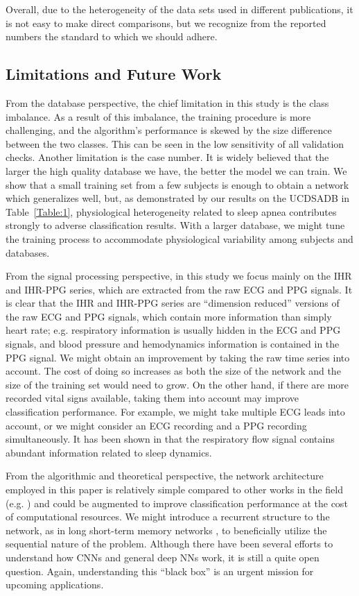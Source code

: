 \documentclass[10pt,a4paper,english]{amsart}
\begin{document}
Overall, due to the heterogeneity of the data sets used in different publications, it is not easy to make direct comparisons, but we recognize from the reported numbers the standard to which we should adhere.


\subsection{Limitations and Future Work}

From the database perspective, the chief limitation in this study is the class imbalance. As a result of this imbalance, the training procedure is more challenging, and the algorithm's performance is skewed by the size difference between the two classes. This can be seen in the low sensitivity of all validation checks. Another limitation is the case number. It is widely believed that the larger the high quality database we have, the better the model we can train. We show that a small training set from a few subjects is enough to obtain a network which generalizes well, but, as demonstrated by our results on the UCDSADB in Table~\ref{Table:1}, physiological heterogeneity related to sleep apnea contributes strongly to adverse classification results.  With a larger database, we might tune the training process to accommodate physiological variability among subjects and databases. 

From the signal processing perspective, in this study we focus mainly on the IHR and IHR-PPG series, which are extracted from the raw ECG and PPG signals. It is clear that the IHR and IHR-PPG series are ``dimension reduced'' versions of the raw ECG and PPG signals, which contain more information than simply heart rate; e.g. respiratory information is usually hidden in the ECG and PPG signals, and blood pressure and hemodynamics information is contained in the PPG signal. We might obtain an improvement by taking the raw time series into account.  The cost of doing so increases as both the size of the network and the size of the training set would need to grow.
%
On the other hand, if there are more recorded vital signs available, taking them into account may improve classification performance. For example, we might take multiple ECG leads into account, or we might consider an ECG recording and a PPG recording simultaneously. It has been shown in \cite{Thomas2005,karlen:2009,Fonseca2015} that the respiratory flow signal contains abundant information related to sleep dynamics.
%

From the algorithmic and theoretical perspective, the network architecture employed in this paper is relatively simple compared to other works in the field (e.g. \cite{yang2015deep}) and could be augmented to improve classification performance at the cost of computational resources. We might introduce a recurrent structure to the network, as in long short-term memory networks \cite{Hochreiter1997}, to beneficially utilize the sequential nature of the problem. Although there have been several efforts \cite{Mallat2012,Patel2016,LinRolnick2017,Wiatowski2017} to understand how CNNs and general deep NNs work, it is still a quite open question. Again, understanding this ``black box'' is an urgent mission for upcoming applications.
\end{document}
